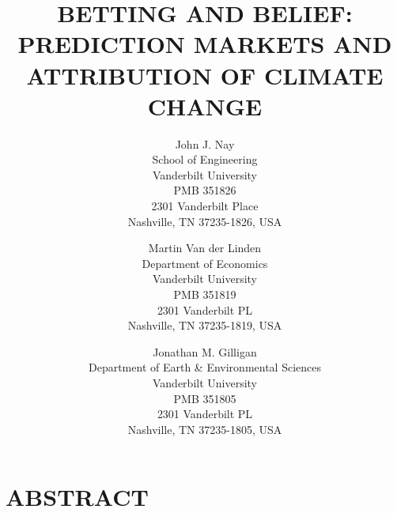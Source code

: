 \documentclass{wscpaperproc}\usepackage[]{graphicx}\usepackage[]{color}
\begin{document}
%
%

\title{BETTING AND BELIEF: PREDICTION MARKETS AND ATTRIBUTION OF CLIMATE CHANGE}

\author{John J. Nay\\ [12pt]
School of Engineering\\
Vanderbilt University \\
PMB 351826 \\
2301 Vanderbilt Place\\
Nashville, TN 37235-1826, USA
\and
Martin Van der Linden\\ [12pt]
Department of Economics\\
Vanderbilt University\\
PMB 351819\\
2301 Vanderbilt PL\\
Nashville, TN 37235-1819, USA\\
\and
Jonathan M. Gilligan\\ [12pt]
Department of Earth \& Environmental Sciences\\
Vanderbilt University\\
PMB 351805\\
2301 Vanderbilt PL\\
Nashville, TN 37235-1805, USA
}

\maketitle
\section*{ABSTRACT}
\end{document}
